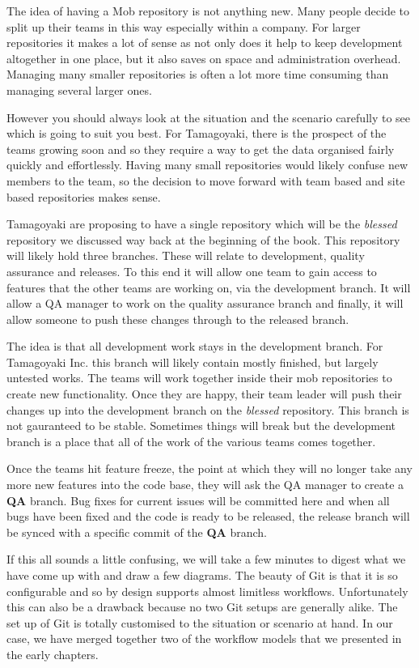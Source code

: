 The idea of having a Mob repository is not anything new.  Many people decide to split up their teams in this way especially within a company.  For larger repositories it makes a lot of sense as not only does it help to keep development altogether in one place, but it also saves on space and administration overhead.  Managing many smaller repositories is often a lot more time consuming than managing several larger ones.  

However you should always look at the situation and the scenario carefully to see which is going to suit you best.  For Tamagoyaki, there is the prospect of the teams growing soon and so they require a way to get the data organised fairly quickly and effortlessly.  Having many small repositories would likely confuse new members to the team, so the decision to move forward with team based and site based repositories makes sense.

Tamagoyaki are proposing to have a single repository which will be the \emph{blessed} repository we discussed way back at the beginning of the book.  This repository will likely hold three branches.  These will relate to development, quality assurance and releases.  To this end it will allow one team to gain access to features that the other teams are working on, via the development branch.  It will allow a QA manager to work on the quality assurance branch and finally, it will allow someone to push these changes through to the released branch.  

The idea is that all development work stays in the development branch.  For Tamagoyaki Inc. this branch will likely contain mostly finished, but largely untested works.  The teams will work together inside their mob repositories to create new functionality.  Once they are happy, their team leader will push their changes up into the development branch on the \emph{blessed} repository.  This branch is not gauranteed to be stable.  Sometimes things will break but the development branch is a place that all of the work of the various teams comes together.  

Once the teams hit feature freeze, the point at which they will no longer take any more new features into the code base, they will ask the QA manager to create a \textbf{QA} branch.  Bug fixes for current issues will be committed here and when all bugs have been fixed and the code is ready to be released, the release branch will be synced with a specific commit of the \textbf{QA} branch.  

If this all sounds a little confusing, we will take a few minutes to digest what we have come up with and draw a few diagrams.  The beauty of Git is that it is so configurable and so by design supports almost limitless workflows.  Unfortunately this can also be a drawback because no two Git setups are generally alike.  The set up of Git is totally customised to the situation or scenario at hand.  In our case, we have merged together two of the workflow models that we presented in the early chapters.

